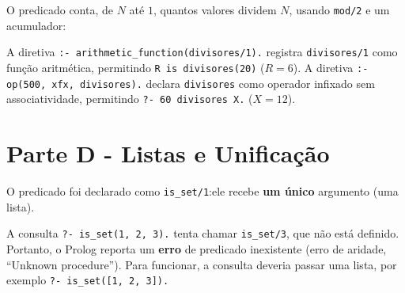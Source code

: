 
\begin{solution}
O predicado conta, de $N$ até $1$, quantos valores dividem $N$, usando \texttt{mod/2} e um acumulador:


A diretiva \texttt{:- arithmetic_function(divisores/1).} registra \texttt{divisores/1} como função aritmética, permitindo \texttt{R is divisores(20)} ($R = 6$). A diretiva \texttt{:- op(500, xfx, divisores).} declara \texttt{divisores} como operador infixado sem associatividade, permitindo \texttt{?- 60 divisores X.} ($X = 12$).
\end{solution}

\section*{Parte D - Listas e Unificação}


\begin{solution}
O predicado foi declarado como \texttt{is_set/1}:ele recebe \textbf{um único} argumento (uma lista).

A consulta \texttt{?- is_set(1, 2, 3).} tenta chamar \texttt{is_set/3}, que não está definido. Portanto, o Prolog reporta um \textbf{erro} de predicado inexistente (erro de aridade, ``Unknown procedure''). Para funcionar, a consulta deveria passar uma lista, por exemplo \texttt{?- is_set([1, 2, 3]).}
\end{solution}

